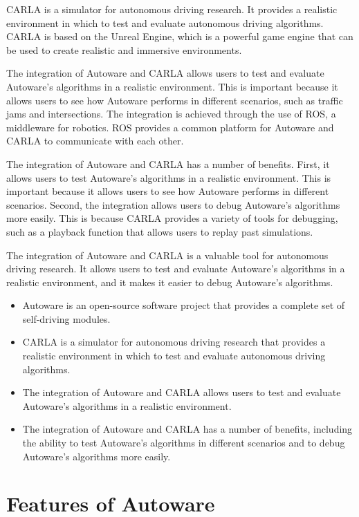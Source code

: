CARLA is a simulator for autonomous driving research. It provides a realistic environment in which to test and evaluate autonomous driving algorithms. CARLA is based on the Unreal Engine, which is a powerful game engine that can be used to create realistic and immersive environments.

The integration of Autoware and CARLA allows users to test and evaluate Autoware's algorithms in a realistic environment. This is important because it allows users to see how Autoware performs in different scenarios, such as traffic jams and intersections. The integration is achieved through the use of ROS, a middleware for robotics. ROS provides a common platform for Autoware and CARLA to communicate with each other.

The integration of Autoware and CARLA has a number of benefits. First, it allows users to test Autoware's algorithms in a realistic environment. This is important because it allows users to see how Autoware performs in different scenarios. Second, the integration allows users to debug Autoware's algorithms more easily. This is because CARLA provides a variety of tools for debugging, such as a playback function that allows users to replay past simulations.

The integration of Autoware and CARLA is a valuable tool for autonomous driving research. It allows users to test and evaluate Autoware's algorithms in a realistic environment, and it makes it easier to debug Autoware's algorithms.

\begin{itemize}
  \item Autoware is an open-source software project that provides a complete set of self-driving modules.
  \item CARLA is a simulator for autonomous driving research that provides a realistic environment in which to test and evaluate autonomous driving algorithms.
  \item The integration of Autoware and CARLA allows users to test and evaluate Autoware's algorithms in a realistic environment.
  \item The integration of Autoware and CARLA has a number of benefits, including the ability to test Autoware's algorithms in different scenarios and to debug Autoware's algorithms more easily.
\end{itemize}

\section{Features of Autoware}

